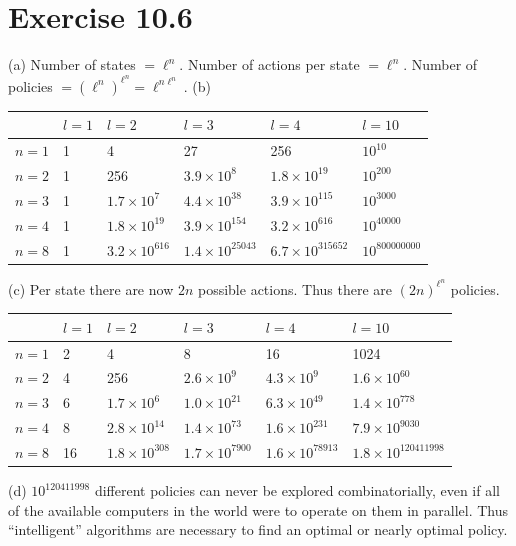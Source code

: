 \documentclass[10pt]{book}
\begin{document}
\section{Exercise 10.6}
(a) Number of states $=\ell^{n}$. Number of actions per state $=\ell^{n}$. Number of policies $=\left(\ell^{n}\right)^{\ell^{n}}=\ell^{n \ell^{n}}$.
(b)
\begin{tabular}{|l|l|l|l|l|l|}
\hline & $l=1$ & $l=2$ & $l=3$ & $l=4$ & $l=10$ \\
\hline $n=1$ & 1 & 4 & 27 & 256 & $10^{10}$ \\
\hline $n=2$ & 1 & 256 & $3.9 \times 10^{8}$ & $1.8 \times 10^{19}$ & $10^{200}$ \\
\hline $n=3$ & 1 & $1.7 \times 10^{7}$ & $4.4 \times 10^{38}$ & $3.9 \times 10^{115}$ & $10^{3000}$ \\
\hline $n=4$ & 1 & $1.8 \times 10^{19}$ & $3.9 \times 10^{154}$ & $3.2 \times 10^{616}$ & $10^{40000}$ \\
\hline $n=8$ & 1 & $3.2 \times 10^{616}$ & $1.4 \times 10^{25043}$ & $6.7 \times 10^{315652}$ & $10^{800000000}$ \\
\hline
\end{tabular}
(c) Per state there are now $2 n$ possible actions. Thus there are $(2 n)^{\ell^{n}}$ policies.
\begin{tabular}{|l|l|l|l|l|l|}
\hline & $l=1$ & $l=2$ & $l=3$ & $l=4$ & $l=10$ \\
\hline $n=1$ & 2 & 4 & 8 & 16 & 1024 \\
\hline $n=2$ & 4 & 256 & $2.6 \times 10^{9}$ & $4.3 \times 10^{9}$ & $1.6 \times 10^{60}$ \\
\hline $n=3$ & 6 & $1.7 \times 10^{6}$ & $1.0 \times 10^{21}$ & $6.3 \times 10^{49}$ & $1.4 \times 10^{778}$ \\
\hline $n=4$ & 8 & $2.8 \times 10^{14}$ & $1.4 \times 10^{73}$ & $1.6 \times 10^{231}$ & $7.9 \times 10^{9030}$ \\
\hline $n=8$ & 16 & $1.8 \times 10^{308}$ & $1.7 \times 10^{7900}$ & $1.6 \times 10^{78913}$ & $1.8 \times 10^{120411998}$ \\
\hline
\end{tabular}
(d) $10^{120411998}$ different policies can never be explored combinatorially, even if all of the available computers in the world were to operate on them in parallel. Thus ``intelligent'' algorithms are necessary to find an optimal or nearly optimal policy.
\end{document}
